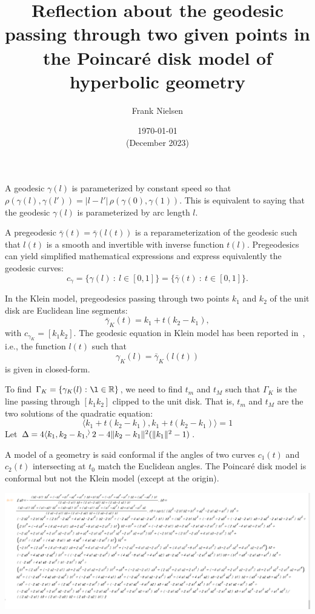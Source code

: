 \documentclass{article}
\title{Reflection about the geodesic passing through two given points in the Poincar\'e disk model of hyperbolic geometry}
\author{Frank Nielsen }
\date{\today\\ (December 2023)}
\def\st{{\ :\ }}
\def\bbR{\mathbb{R}}
\def\inner#1#2{\langle #1,#2\rangle}
\begin{document}
\maketitle

A geodesic $\gamma(l)$ is parameterized by constant speed so that $\rho(\gamma(l),\gamma(l'))=|l-l'|\, \rho(\gamma(0),\gamma(1))$.
This is equivalent to saying that the geodesic $\gamma(l)$ is parameterized by arc length $l$.

A pregeodesic $\bar\gamma(t)=\bar\gamma(l(t))$ is a reparameterization of the geodesic such that $l(t)$ is a smooth and invertible with inverse function $t(l)$.
Pregeodesics can yield simplified mathematical expressions and express equivalently the geodesic curves:
$$
c_\gamma=\{\gamma(l) \st l\in [0,1]\} = \{\bar\gamma(t) \st t\in [0,1]\}.
$$

In the Klein model, pregeodesics passing through two points $k_1$ and $k_2$ of the unit disk are Euclidean line segments:
$$
\bar\gamma_K(t)=k_1+t(k_2-k_1),
$$
with $c_{\gamma_K}=[k_1k_2]$.
The geodesic equation in Klein model has been reported in~\cite{nielsen2012hyperbolic}, i.e., the function $l(t)$ such that
$$
\gamma_K(l)=\bar\gamma_K(l(t))
$$
is given in closed-form.


To find $\Gamma_K=\{\gamma_K(l) \st \l\in\bbR\}$, we need to find $t_m$ and $t_M$ such that $\Gamma_K$ is the line passing through $[k_1k_2]$ clipped to the unit disk.
That is, $t_m$ and $t_M$ are the two solutions of the quadratic equation:
$$
\inner{k_1+t(k_2-k_1)}{k_1+t(k_2-k_1)}=1
$$
Let $\Delta=4\inner{k_1,k_2-k_1}^2-4 \|k_2-k_1\|^2 (\|k_1\|^2-1)$.


A model of a geometry is said conformal if the angles of two curves $c_1(t)$ and $c_2(t)$ intersecting at $t_0$ match the Euclidean angles.
The Poincar\'e disk model is conformal but not the Klein model (except at the origin).




\begin{center}
\includegraphics[width=\textwidth]{ReflectionPoincare3Points.png}
 \end{center}
\end{document}
